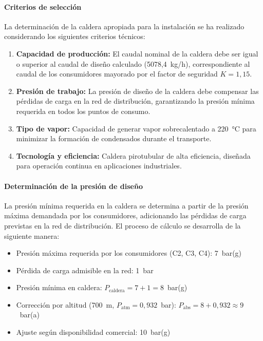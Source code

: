\documentclass[12pt]{article}
\begin{document}
\paragraph{Criterios de selección}

La determinación de la caldera apropiada para la instalación se ha realizado considerando los siguientes criterios técnicos:

\begin{enumerate}[label=\arabic*., leftmargin=2em]
	\item \textbf{Capacidad de producción:} El caudal nominal de la caldera debe ser igual o superior al caudal de diseño calculado (5078,4~kg/h), correspondiente al caudal de los consumidores mayorado por el factor de seguridad $K = 1{,}15$.
	\item \textbf{Presión de trabajo:} La presión de diseño de la caldera debe compensar las pérdidas de carga en la red de distribución, garantizando la presión mínima requerida en todos los puntos de consumo.
	\item \textbf{Tipo de vapor:} Capacidad de generar vapor sobrecalentado a 220~°C para minimizar la formación de condensados durante el transporte.
	\item \textbf{Tecnología y eficiencia:} Caldera pirotubular de alta eficiencia, diseñada para operación continua en aplicaciones industriales.
\end{enumerate}

\paragraph{Determinación de la presión de diseño}

La presión mínima requerida en la caldera se determina a partir de la presión máxima demandada por los consumidores, adicionando las pérdidas de carga previstas en la red de distribución. El proceso de cálculo se desarrolla de la siguiente manera:

\begin{itemize}[leftmargin=2em]
	\item Presión máxima requerida por los consumidores (C2, C3, C4): 7~bar(g)
	\item Pérdida de carga admisible en la red: 1~bar
	\item Presión mínima en caldera: $P_{\text{caldera}} = 7 + 1 = 8$~bar(g)
	\item Corrección por altitud (700~m, $P_{\text{atm}} = 0{,}932$~bar): $P_{\text{abs}} = 8 + 0{,}932 \approx 9$~bar(a)
	\item Ajuste según disponibilidad comercial: 10~bar(g)
\end{itemize}
\end{document}

